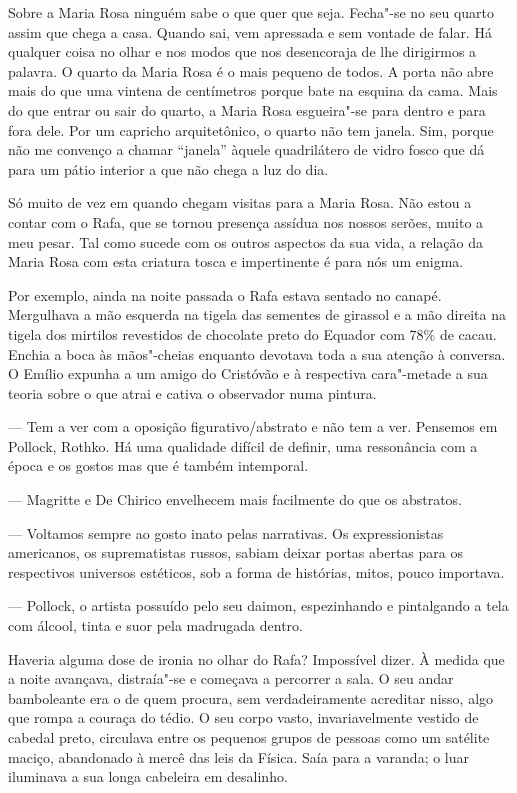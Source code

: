 Sobre a Maria Rosa ninguém sabe o que quer que seja. Fecha"-se no seu
quarto assim que chega a casa. Quando sai, vem apressada e sem vontade
de falar. Há qualquer coisa no olhar e nos modos que nos desencoraja de
lhe dirigirmos a palavra. O quarto da Maria Rosa é o mais pequeno de
todos. A porta não abre mais do que uma vintena de centímetros porque
bate na esquina da cama. Mais do que entrar ou sair do quarto, a Maria
Rosa esgueira"-se para dentro e para fora dele. Por um capricho
arquitetônico, o quarto não tem janela. Sim, porque não me convenço a
chamar ``janela'' àquele quadrilátero de vidro fosco que dá para um
pátio interior a que não chega a luz do dia.

Só muito de vez em quando chegam visitas para a Maria Rosa. Não estou a
contar com o Rafa, que se tornou presença assídua nos nossos serões,
muito a meu pesar. Tal como sucede com os outros aspectos da sua vida, a
relação da Maria Rosa
com esta criatura tosca e impertinente é para nós um enigma.

Por exemplo, ainda na noite passada o Rafa estava sentado no canapé.
Mergulhava a mão esquerda na tigela das sementes de girassol e a mão
direita na tigela dos mirtilos revestidos de chocolate preto do Equador
com 78\% de cacau. Enchia a boca às mãos"-cheias enquanto devotava toda a
sua atenção à conversa. O Emílio expunha a um amigo do Cristóvão e à
respectiva cara"-metade a sua teoria sobre o que atrai e cativa o
observador numa pintura.

--- Tem a ver com a oposição figurativo/abstrato e não tem a ver.
  Pensemos em Pollock, Rothko. Há uma qualidade difícil de definir, uma
  ressonância com a época e os gostos mas que é também intemporal.

--- Magritte e De Chirico envelhecem mais facilmente do que os abstratos.

--- Voltamos sempre ao gosto inato pelas narrativas. Os expressionistas
  americanos, os suprematistas russos, sabiam deixar portas abertas para
  os respectivos universos estéticos, sob a forma de histórias, mitos,
  pouco importava.

--- Pollock, o artista possuído pelo seu daimon, espezinhando e
  pintalgando a tela com álcool, tinta e suor pela madrugada dentro.


Haveria alguma dose de ironia no olhar do Rafa? Impossível dizer. À
medida que a noite avançava, distraía"-se e começava a percorrer a sala.
O seu andar bamboleante era o de quem procura, sem verdadeiramente
acreditar nisso, algo que rompa a couraça do tédio. O seu corpo vasto,
invariavelmente vestido de cabedal preto, circulava entre os pequenos
grupos de pessoas como um satélite maciço, abandonado à mercê das leis
da Física. Saía para a varanda; o luar iluminava a sua longa cabeleira
em desalinho.

